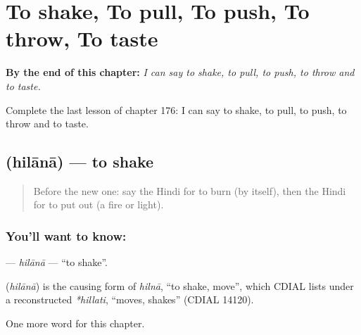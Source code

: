 
\chapter{To shake, To pull, To push, To throw, To taste}
\label{ch:hi-to-shake-to-pull-to-push-to-throw-to-taste}

\begin{chapteropening}
\textbf{By the end of this chapter:} \emph{I can say to shake, to pull, to push, to throw and to taste.}

Complete the last lesson of chapter 176: I can say to shake, to pull, to push, to throw and to taste.
\end{chapteropening}

\section[\texorpdfstring{\hi{हिलाना} (hilānā)}{हिलाना (hilānā)}]{ (hilānā) — to shake}

\label{lesson:HI-C176-hilana}



\begin{quote}
Before the new one: say the Hindi for to burn (by itself), then the Hindi for to put out (a fire or light).
\end{quote}

\subsection*{You'll want to know: }
\textbf{} — \emph{hilānā} — \textquotedblleft{}to shake\textquotedblright{}.

\begin{cousinweb}
\textbf{} (\emph{hilānā}) is the causing form of \emph{hilnā}, \textquotedblleft{}to shake, move\textquotedblright{}, which CDIAL lists under a reconstructed \emph{*hillati}, \textquotedblleft{}moves, shakes\textquotedblright{} (CDIAL 14120).
\end{cousinweb}

\begin{grammarlens}[title={What you've built}]
One more word for this chapter.
\end{grammarlens}

